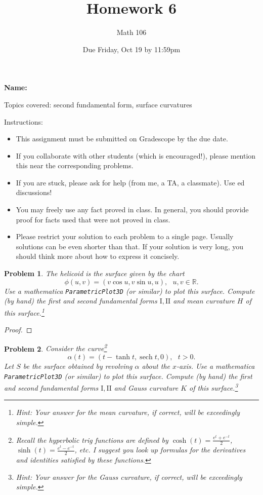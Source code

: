 \documentclass[11pt]{article}
\author{Math 106}
\date{Due Friday, Oct 19 by 11:59pm}
\title{Homework 6}
\newtheorem{problem}{Problem}
\DeclareMathOperator{\sech}{sech}
\begin{document}
\maketitle

{\bf\Large Name:} 


\vspace{.3in}
Topics covered: second fundamental form, surface curvatures

Instructions: 
\begin{itemize}
\item This assignment must be submitted on Gradescope by the due date. 
\item If you collaborate with other students (which is encouraged!), please mention this near the corresponding problems. 
\item If you are stuck, please ask for help (from me, a TA, a classmate). Use ed discussions!  
\item You may freely use any fact proved in class. In general, you should provide proof for facts used that were not proved in class. 
\item Please restrict your solution to each problem to a single page. Usually solutions can be even shorter than that. If your solution is very long, you should think more about how to express it concisely.
\end{itemize}
\pagebreak 


\begin{problem}
The helicoid is the surface given by the chart
\[\phi(u,v)=(v\cos u,v\sin u,u), \>\>\>u,v\in\mathbb R.\]
Use a mathematica \texttt{ParametricPlot3D} (or similar) to plot this surface. Compute (by hand) the first and second fundamental forms $\mathrm I,\mathrm{I\!I}$ and mean curvature $H$ of this surface.\footnote{Hint: Your answer for the mean curvature, if correct, will be exceedingly simple.} 
\end{problem}

\begin{proof}

\end{proof}

\pagebreak


\begin{problem}
Consider the curve\footnote{Recall the hyperbolic trig functions are defined by $\cosh(t)=\frac{e^t+e^{-t}}{2}$, $\sinh(t)=\frac{e^t-e^{-t}}{2}$, etc. I suggest you look up formulas for the derivatives and identities satisfied by these functions.}
\[\alpha(t)=(t-\tanh t,\sech t,0),\>\>\>t>0.\]
Let $S$ be the surface obtained by revolving $\alpha$ about the $x$-axis. Use a mathematica \texttt{ParametricPlot3D} (or similar) to plot this surface. Compute (by hand) the first and second fundamental forms $\mathrm I,\mathrm{I\!I}$ and Gauss curvature $K$ of this surface.\footnote{Hint: Your answer for the Gauss curvature, if correct, will be exceedingly simple.} 
\end{problem}
\end{document}
